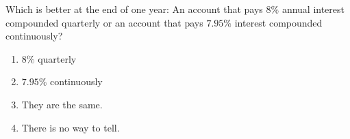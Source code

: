 \bigskip

\item
Which is better at the end of one year:  An account that pays $8\%$ annual interest compounded quarterly or an account that pays $7.95\%$ interest compounded continuously?

\begin{enumerate}
\item $8\%$ quarterly
\item $7.95\%$ continuously
\item They are the same.
\item There is no way to tell.
\end{enumerate}

